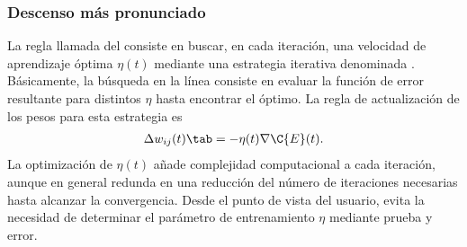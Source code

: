 %
\subsubsection{Descenso más pronunciado}
%
La regla llamada del  consiste
en buscar, en cada iteración, una velocidad de aprendizaje óptima
$\eta(t)$ mediante una estrategia iterativa denominada .  Básicamente, la búsqueda en la línea consiste en evaluar
la función de error resultante para distintos $\eta$ hasta encontrar
el óptimo.  La regla de actualización de los pesos
para esta estrategia es
%
\begin{align}\label{e2:delta-rule-steepest}
  \Delta w_{ij}(t)\tab=-\eta(t)\nabla{\C{E}(t)}.
\end{align}
%
La optimización de $\eta(t)$ añade complejidad computacional a cada
iteración, aunque en general redunda en una reducción del número de
iteraciones necesarias hasta alcanzar la convergencia.  Desde el punto
de vista del usuario, evita la necesidad de determinar el parámetro de
entrenamiento $\eta$ mediante prueba y error.
